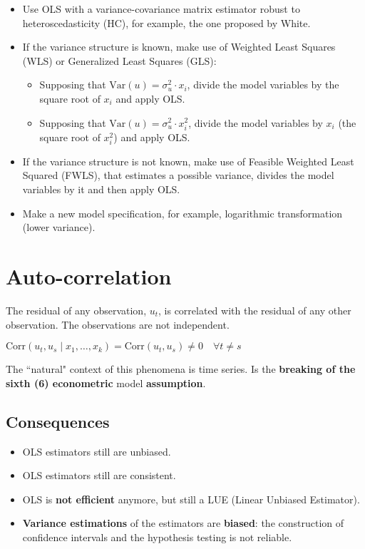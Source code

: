 \documentclass[10pt, a4paper, landscape]{extarticle}
\newcommand{\Var}{\mathrm{Var}}
\newcommand{\Corr}{\mathrm{Corr}}
\begin{document}
\begin{multicols}{3}
\begin{itemize}[leftmargin=*]
	\item Use OLS with a variance-covariance matrix estimator robust to heteroscedasticity (HC), for example, the one proposed by White.
	\item If the variance structure is known, make use of Weighted Least Squares (WLS) or Generalized Least Squares (GLS):
	\begin{itemize}[leftmargin=*]
		\item Supposing that $\Var(u) = \sigma^2_u \cdot x_i$, divide the model variables by the square root of $x_i$ and apply OLS.
		\item Supposing that $\Var(u) = \sigma^2_u \cdot x_i^2$, divide the model variables by $x_i$ (the square root of $x_i^2$) and apply OLS.
	\end{itemize}
	\item If the variance structure is not known, make use of Feasible Weighted Least Squared (FWLS), that estimates a possible variance, divides the model variables by it and then apply OLS.
	\item Make a new model specification, for example, logarithmic transformation (lower variance).
\end{itemize}

\columnbreak

\section*{Auto-correlation}

The residual of any observation, $u_t$, is correlated with the residual of any other observation. The observations are not independent.

\begin{center}
	$\Corr(u_t, u_s \mid x_1, \ldots, x_k) = \Corr(u_t, u_s) \neq 0 \quad \forall t \neq s$
\end{center}

The ``natural" context of this phenomena is time series. Is the \textbf{breaking of the sixth (6) econometric} model \textbf{assumption}.

\subsection*{Consequences}

\begin{itemize}[leftmargin=*]
	\item OLS estimators still are unbiased.
	\item OLS estimators still are consistent.
	\item OLS is \textbf{not efficient} anymore, but still a LUE (Linear Unbiased Estimator).
	\item \textbf{Variance estimations} of the estimators are \textbf{biased}: the construction of confidence intervals and the hypothesis testing is not reliable.
\end{itemize}


\end{multicols}
\end{document}

